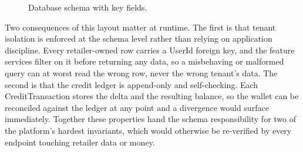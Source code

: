 \begin{figure}[H]
{%
}
\caption{Database schema with key fields.}
\label{fig:schema}
\end{figure}

Two consequences of this layout matter at runtime. The first is that tenant isolation is enforced at the schema level rather than relying on application discipline. Every retailer-owned row carries a UserId foreign key, and the feature services filter on it before returning any data, so a misbehaving or malformed query can at worst read the wrong row, never the wrong tenant's data. The second is that the credit ledger is append-only and self-checking. Each CreditTransaction stores the delta and the resulting balance, so the wallet can be reconciled against the ledger at any point and a divergence would surface immediately. Together these properties hand the schema responsibility for two of the platform's hardest invariants, which would otherwise be re-verified by every endpoint touching retailer data or money.

